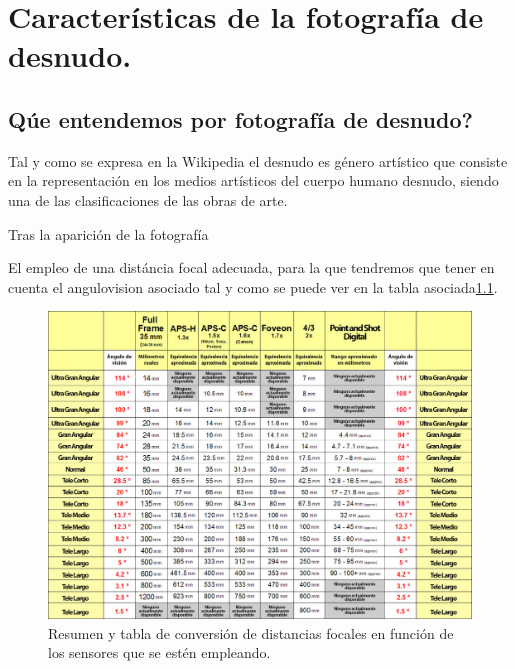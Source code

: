 \chapter{Caracter\'isticas de la fotograf\'ia de desnudo.}

\section{\textquestiondown Q\'ue entendemos por fotograf\'ia de desnudo?}
Tal y como se expresa en la Wikipedia\cite{wiki:xxx} el desnudo es g\'enero art\'istico que consiste en la representaci\'on en los medios art\'isticos del cuerpo humano desnudo, siendo una de las clasificaciones de las obras de arte.

Tras la aparici\'on de la fotograf\'ia

El empleo de una dist\'ancia focal adecuada, para la que tendremos que tener en cuenta el  \gls{angulovision} asociado tal y como se puede ver en la tabla asociada\ref{fig:angulos2-1}.

\begin{figure}[th!]
	\centering
	\includegraphics[width=0.7\linewidth]{imagenes/angulos2-1}
	\caption[Resumen de formatos, distancias focales y \'angulos en lentes]{Resumen y tabla de conversi\'on de distancias focales en funci\'on de los sensores que se est\'en empleando\cite{web:estudionadjar}.}
	\label{fig:angulos2-1}
\end{figure}
